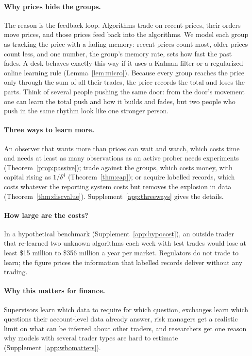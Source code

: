 \documentclass[12pt]{article}
\theoremstyle{definition}
\theoremstyle{remark}
\begin{document}
\paragraph{Why prices hide the groups.} The reason is the feedback loop. Algorithms trade on recent prices, their orders move prices, and those prices feed back into the algorithms. We model each group as tracking the price with a fading memory: recent prices count most, older prices count less, and one number, the group's memory rate, sets how fast the past fades. A desk behaves exactly this way if it uses a Kalman filter or a regularized online learning rule (Lemma~\ref{lem:micro}). Because every group reaches the price only through the sum of all their trades, the price records the total and loses the parts. Think of several people pushing the same door: from the door's movement one can learn the total push and how it builds and fades, but two people who push in the same rhythm look like one stronger person.

\paragraph{Three ways to learn more.} An observer that wants more than prices can wait and watch, which costs time and needs at least as many observations as an active prober needs experiments (Theorem~\ref{prop:passive}); trade against the groups, which costs money, with capital rising as $1/\delta^4$ (Theorem~\ref{thm:cap}); or acquire labelled records, which costs whatever the reporting system costs but removes the explosion in data (Theorem~\ref{thm:discvalue}). Supplement~\ref{app:threeways} gives the details.

\paragraph{How large are the costs?} In a hypothetical benchmark (Supplement~\ref{app:hypocost}), an outside trader that re-learned two unknown algorithms each week with test trades would lose at least \$15 million to \$356 million a year per market. Regulators do not trade to learn; the figure prices the information that labelled records deliver without any trading.

\paragraph{Why this matters for finance.} Supervisors learn which data to require for which question, exchanges learn which questions their account-level data already answer, risk managers get a realistic limit on what can be inferred about other traders, and researchers get one reason why models with several trader types are hard to estimate (Supplement~\ref{app:whomatters}).
\end{document}
